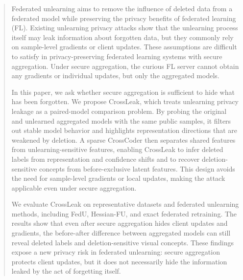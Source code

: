 

\begin{abstract}

Federated unlearning aims to remove the influence of deleted data from a federated model while preserving the privacy benefits of federated learning (FL). Existing unlearning privacy attacks show that the unlearning process itself may leak information about forgotten data, but they commonly rely on sample-level gradients or client updates. These assumptions are difficult to satisfy in privacy-preserving federated learning systems with secure aggregation. Under secure aggregation, the curious FL server cannot obtain any gradients or individual updates, but only the aggregated models.

In this paper, we ask whether secure aggregation is sufficient to hide what has been forgotten. We propose CrossLeak, which treats unlearning privacy leakage as a paired-model comparison problem. By probing the original and unlearned aggregated models with the same public samples, it filters out stable model behavior and highlights representation directions that are weakened by deletion. A sparse CrossCoder then separates shared features from unlearning-sensitive features, enabling CrossLeak to infer deleted labels from representation and confidence shifts and to recover deletion-sensitive concepts from before-exclusive latent features. This design avoids the need for sample-level gradients or local updates, making the attack applicable even under secure aggregation.


We evaluate CrossLeak on representative datasets and federated unlearning methods, including FedU, Hessian-FU, and exact federated retraining. The results show that even after secure aggregation hides client updates and gradients, the before-after difference between aggregated models can still reveal deleted labels and deletion-sensitive visual concepts. These findings expose a new privacy risk in federated unlearning: secure aggregation protects client updates, but it does not necessarily hide the information leaked by the act of forgetting itself.
 
\end{abstract}
